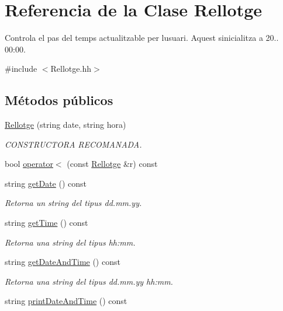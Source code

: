 \hypertarget{class_rellotge}{}\section{Referencia de la Clase Rellotge}
\label{class_rellotge}


Controla el pas del temps actualitzable per l\textquotesingle{}usuari. Aquest s\textquotesingle{}inicialitza a 20.. 00\+:00.  




{\ttfamily \#include $<$Rellotge.\+hh$>$}

\subsection*{Métodos públicos}
\begin{DoxyCompactItemize}
\item 
\hyperlink{class_rellotge_a32a5ede4b39b3dfc22a10d93a68d4173}{Rellotge} (string date, string hora)
\begin{DoxyCompactList}\small\item\em C\+O\+N\+S\+T\+R\+U\+C\+T\+O\+R\+A R\+E\+C\+O\+M\+A\+N\+A\+D\+A. \end{DoxyCompactList}\item 
bool \hyperlink{class_rellotge_aec4d03763b1bfed2821e2df4a3923b19}{operator$<$} (const \hyperlink{class_rellotge}{Rellotge} \&r) const 
\item 
string \hyperlink{class_rellotge_addfca1622b9aeba2cdff685060871153}{get\+Date} () const 
\begin{DoxyCompactList}\small\item\em Retorna un string del tipus dd.\+mm.\+yy. \end{DoxyCompactList}\item 
string \hyperlink{class_rellotge_af7a5cf18e7903db9fbaffe526fcf5a06}{get\+Time} () const 
\begin{DoxyCompactList}\small\item\em Retorna una string del tipus hh\+:mm. \end{DoxyCompactList}\item 
string \hyperlink{class_rellotge_a2ee21b1a870f7ca670e54cadeb0ee62d}{get\+Date\+And\+Time} () const 
\begin{DoxyCompactList}\small\item\em Retorna una string del tipus dd.\+mm.\+yy hh\+:mm. \end{DoxyCompactList}\item 
string \hyperlink{class_rellotge_abe2b43818a3c3283d499a4070efa6c7f}{print\+Date\+And\+Time} () const 

\end{DoxyCompactItemize}
